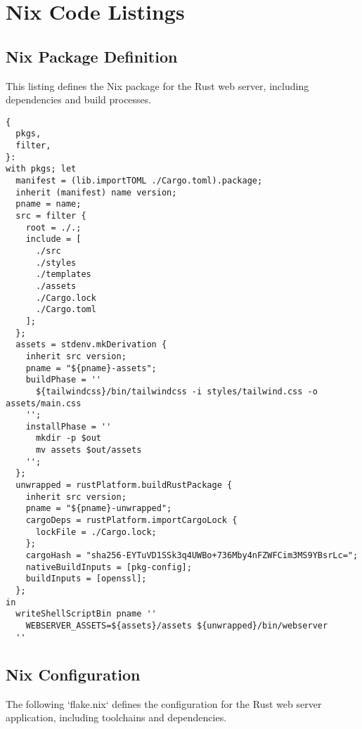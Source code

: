 \chapter{Nix Code Listings}

\section{Nix Package Definition}

This listing defines the Nix package for the Rust web server,
including dependencies and build processes.

\label{appendix:nix:nixpkg}
\begin{lstlisting}[caption={Nix Package Definition for Rust Web Server}, label=lst:nixpkg]
{
  pkgs,
  filter,
}:
with pkgs; let
  manifest = (lib.importTOML ./Cargo.toml).package;
  inherit (manifest) name version;
  pname = name;
  src = filter {
    root = ./.;
    include = [
      ./src
      ./styles
      ./templates
      ./assets
      ./Cargo.lock
      ./Cargo.toml
    ];
  };
  assets = stdenv.mkDerivation {
    inherit src version;
    pname = "${pname}-assets";
    buildPhase = ''
      ${tailwindcss}/bin/tailwindcss -i styles/tailwind.css -o assets/main.css
    '';
    installPhase = ''
      mkdir -p $out
      mv assets $out/assets
    '';
  };
  unwrapped = rustPlatform.buildRustPackage {
    inherit src version;
    pname = "${pname}-unwrapped";
    cargoDeps = rustPlatform.importCargoLock {
      lockFile = ./Cargo.lock;
    };
    cargoHash = "sha256-EYTuVD1SSk3q4UWBo+736Mby4nFZWFCim3MS9YBsrLc=";
    nativeBuildInputs = [pkg-config];
    buildInputs = [openssl];
  };
in
  writeShellScriptBin pname ''
    WEBSERVER_ASSETS=${assets}/assets ${unwrapped}/bin/webserver
  ''
\end{lstlisting}


\section{Nix Configuration}

The following `flake.nix` defines the configuration for the Rust web server application,
including toolchains and dependencies.

